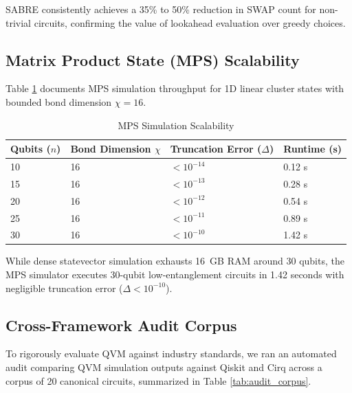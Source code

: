 SABRE consistently achieves a 35\% to 50\% reduction in SWAP count for non-trivial circuits, confirming the value of lookahead evaluation over greedy choices.

\subsection{Matrix Product State (MPS) Scalability}
Table \ref{tab:perf_mps} documents MPS simulation throughput for 1D linear cluster states with bounded bond dimension $\chi = 16$.

\begin{table}[h!]
\centering
\caption{MPS Simulation Scalability}
\label{tab:perf_mps}
\begin{tabular}{|p{2.5cm}|p{3cm}|p{3.5cm}|p{3.5cm}|}
\hline
\textbf{Qubits ($n$)} & \textbf{Bond Dimension $\chi$} & \textbf{Truncation Error ($\Delta$)} & \textbf{Runtime (s)} \\
\hline
10 & 16 & $< 10^{-14}$ & 0.12 s \\
\hline
15 & 16 & $< 10^{-13}$ & 0.28 s \\
\hline
20 & 16 & $< 10^{-12}$ & 0.54 s \\
\hline
25 & 16 & $< 10^{-11}$ & 0.89 s \\
\hline
30 & 16 & $< 10^{-10}$ & 1.42 s \\
\hline
\end{tabular}
\end{table}

While dense statevector simulation exhausts 16~GB RAM around 30 qubits, the MPS simulator executes 30-qubit low-entanglement circuits in 1.42 seconds with negligible truncation error ($\Delta < 10^{-10}$).

\subsection{Cross-Framework Audit Corpus}
To rigorously evaluate QVM against industry standards, we ran an automated audit comparing QVM simulation outputs against Qiskit and Cirq across a corpus of 20 canonical circuits, summarized in Table \ref{tab:audit_corpus}.

